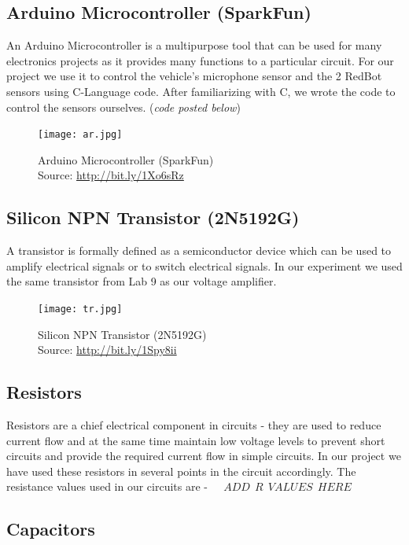 \documentclass[12pt,a4paper]{article}
\begin{document}
\begin{large}
\subsection{Arduino Microcontroller (SparkFun)}
An Arduino Microcontroller is a multipurpose tool that can be used for many electronics projects as it provides many functions to a particular circuit. For our project we use it to control the vehicle's microphone sensor and the 2 RedBot sensors using C-Language code. After familiarizing with C, we wrote the code to control the sensors ourselves. (\textit{code posted below})
\begin{figure}[hbp]
\centering
\texttt{[image: ar.jpg]}
\caption{\label{fig:i}Arduino Microcontroller (SparkFun)\\Source: \protect\url{http://bit.ly/1Xo6sRz}}
\end{figure}

\subsection{Silicon NPN Transistor (2N5192G)}
A transistor is formally defined as a semiconductor device which can be used to amplify electrical signals or to switch electrical signals. In our experiment we used the same transistor from Lab 9 as our voltage amplifier.\\

\begin{figure}[hbp]
\centering
\texttt{[image: tr.jpg]}
\caption{\label{fig:4}Silicon NPN Transistor (2N5192G)\\Source: \protect\url{http://bit.ly/1Spy8ii}}
\end{figure}

\subsection{Resistors}

Resistors are a chief electrical component in circuits - they are used to reduce current flow and at the same time maintain low voltage levels  to prevent short circuits and provide the required current flow in simple circuits. In our project we have used these resistors in several points in the circuit accordingly. The resistance values used in our circuits are - $~~~~~ADD ~~R~~ VALUES ~~HERE~~~~$\\


\subsection{Capacitors}


\end{large}
\end{document}
